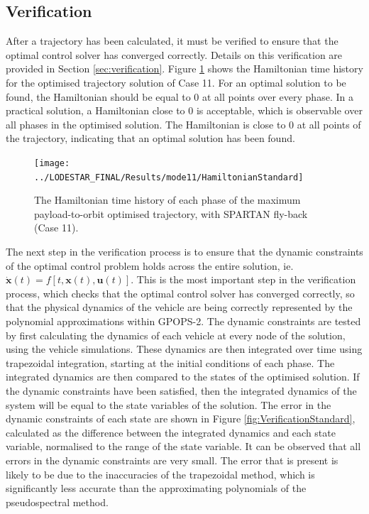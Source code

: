 \subsection{Verification}

After a trajectory has been calculated, it must be verified to ensure that the optimal control solver has converged correctly. Details on this verification are provided in Section \ref{sec:verification}. Figure \ref{fig:HamiltonianStandard} shows the Hamiltonian time history for the optimised trajectory solution of Case 11. For an optimal solution to be found, the Hamiltonian should be equal to 0 at all points over every phase. In a practical solution, a Hamiltonian close to 0 is acceptable, which is observable over all phases in the optimised solution. The Hamiltonian is close to 0 at all points of the trajectory, indicating that an optimal solution has been found. 
\begin{figure}[ht]
	\centering
	\texttt{[image: ../LODESTAR\_FINAL/Results/mode11/HamiltonianStandard]}
	\caption{The Hamiltonian time history of each phase of the maximum payload-to-orbit optimised trajectory, with SPARTAN fly-back (Case 11).}
	\label{fig:HamiltonianStandard}
\end{figure}

The next step in the verification process is to ensure that the dynamic constraints of the optimal control problem holds across the entire solution, ie. $\dot{\textbf{x}}(t) = f[t,\textbf{x}(t),\textbf{u}(t)]$. This is the most important step in the verification process, which checks that the optimal control solver has converged correctly, so that the physical dynamics of the vehicle are being correctly represented by the polynomial approximations within GPOPS-2. The dynamic constraints are tested by first calculating the dynamics of each vehicle at every node of the solution, using the vehicle simulations. These dynamics are then integrated over time using trapezoidal integration, starting at the initial conditions of each phase. The integrated dynamics are then compared to the states of the optimised solution. If the dynamic constraints have been satisfied, then the integrated dynamics of the system will be equal to the state variables of the solution. The error in the dynamic constraints of each state are shown in Figure \ref{fig:VerificationStandard}, calculated as the difference between the integrated dynamics and each state variable, normalised to the range of the state variable. 
It can be observed that all errors in the dynamic constraints are very small. The error that is present is likely to be due to the inaccuracies of the trapezoidal method, which is significantly less accurate than the approximating polynomials of the pseudospectral method. 



